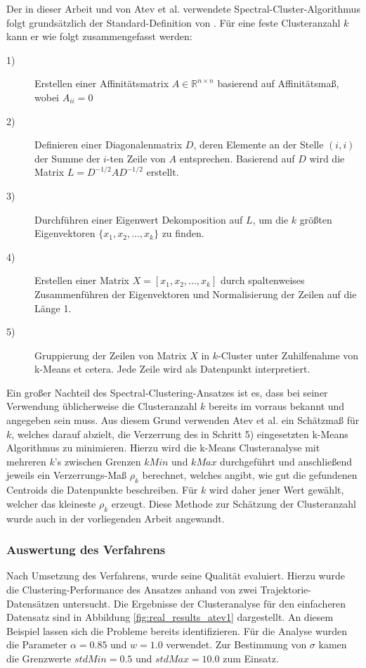 Der in dieser Arbeit und von Atev et al. verwendete Spectral-Cluster-Algorithmus folgt grundsätzlich
der Standard-Definition von \cite[]{Ng2002}.
Für eine feste Clusteranzahl $k$ kann er wie folgt zusammengefasst werden:

\begin{description}
    \item[1)] Erstellen einer Affinitätsmatrix $A \in \mathbb{R}^{n \times n}$ basierend auf Affinitätsmaß, wobei $A_{ii} = 0$
    \item[2)] Definieren einer Diagonalenmatrix $D$, deren Elemente an der Stelle $(i,i)$ der Summe der $i$-ten
            Zeile von $A$ entsprechen. Basierend auf $D$ wird die Matrix $L = D^{-1/2} AD^{-1/2}$ erstellt.
    \item[3)] Durchführen einer Eigenwert Dekomposition auf $L$, um die $k$ größten Eigenvektoren
            $\{x_1, x_2, ..., x_k\}$ zu finden.
    \item[4)] Erstellen einer Matrix $X = [x_1, x_2,..., x_k]$ durch spaltenweises Zusammenführen der Eigenvektoren und
            Normalisierung der Zeilen auf die Länge 1.
    \item[5)] Gruppierung der Zeilen von Matrix $X$ in $k$-Cluster unter Zuhilfenahme von k-Means et cetera.
            Jede Zeile wird als Datenpunkt interpretiert.
\end{description}

Ein großer Nachteil des Spectral-Clustering-Ansatzes ist es, dass bei seiner Verwendung üblicherweise die Clusteranzahl $k$
bereits im vorraus bekannt und angegeben sein muss. Aus diesem Grund verwenden Atev et al. ein Schätzmaß für
$k$, welches darauf abzielt, die Verzerrung des in Schritt 5) eingesetzten k-Means Algorithmus zu minimieren.
Hierzu wird die k-Means Clusteranalyse mit mehreren $k$'s zwischen Grenzen $kMin$ und $kMax$ durchgeführt
und anschließend jeweils ein Verzerrungs-Maß $\rho_k$ berechnet, welches angibt, wie gut die gefundenen Centroids
die Datenpunkte beschreiben. Für $k$ wird daher jener Wert gewählt, welcher das
kleineste $\rho_k$ erzeugt. Diese Methode zur Schätzung der Clusteranzahl wurde auch in der vorliegenden
Arbeit angewandt.

\subsubsection{Auswertung des Verfahrens}

Nach Umsetzung des Verfahrens, wurde seine Qualität evaluiert. Hierzu wurde die Clustering-Performance des Ansatzes
anhand von zwei Trajektorie-Datensätzen untersucht.
Die Ergebnisse der Clusteranalyse für den einfacheren Datensatz sind in Abbildung \ref{fig:real_results_atev1}
dargestellt. An diesem Beispiel lassen sich die Probleme bereits identifizieren.
Für die Analyse wurden die Parameter $\alpha = 0.85$ und $w = 1.0$ verwendet.
Zur Bestimmung von $\sigma$ kamen die Grenzwerte $stdMin = 0.5$ und $stdMax = 10.0$ zum Einsatz.

